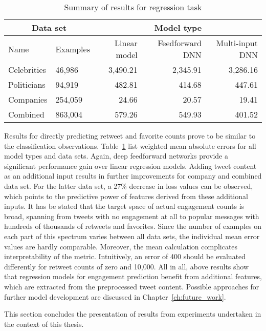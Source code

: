 \begin{table}
\begin{tabular}{llrrr}
\toprule
\multicolumn{2}{c}{Data set} & \multicolumn{3}{c}{Model type} \\
\midrule
Name & Examples & Linear model & Feedforward DNN & Multi-input DNN \\
\midrule
Celebrities & 46,986 & 3,490.21 & 2,345.91 & 3,286.16 \\
Politicians & 94,919 & 482.81 & 414.68 & 447.61 \\
Companies & 254,059 & 24.66 & 20.57 & 19.41 \\
Combined & 863,004 & 579.26 & 549.93 & 401.52 \\
\bottomrule
\end{tabular}
\caption{Summary of results for regression task}
\label{tab:summary_regression}
\end{table}

Results for directly predicting retweet and favorite counts prove to be similar
to the classification observations.
Table~\ref{tab:summary_regression} list weighted mean absolute errors for all model types
and data sets.
Again, deep feedforward networks provide a significant performance gain over
linear regression models.
Adding tweet content as an additional input results in further improvements for
company and combined data set.
For the latter data set, a 27\% decrease in loss values can be observed, which
points to the predictive power of features derived from these additional inputs.
It has be stated that the target space of actual engagement counts is broad, spanning
from tweets with no engagement at all to popular messages with hundreds of thousands
of retweets and favorites.
Since the number of examples on each part of this spectrum varies between all
data sets, the individual mean error values are hardly comparable.
Moreover, the mean calculation complicates interpretability of the metric.
Intuitively, an error of 400 should be evaluated differently for retweet counts
of zero and 10,000.
All in all, above results show that regression models for engagement prediction
benefit from additional features, which are extracted from the preprocessed
tweet content.
Possible approaches for further model development are discussed in Chapter~\ref{ch:future_work}.

This section concludes the presentation of results from experiments undertaken
in the context of this thesis.
